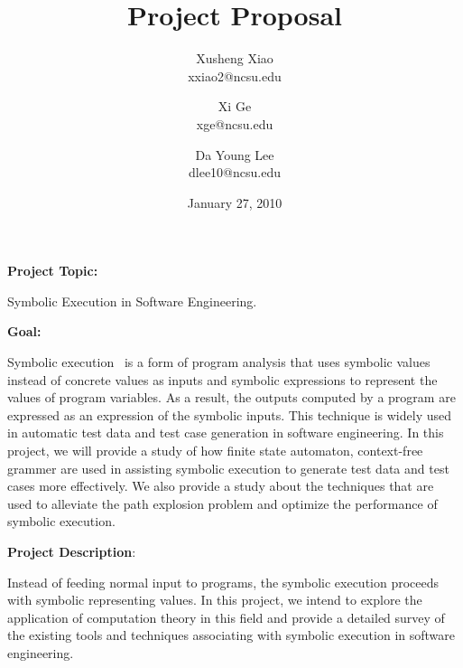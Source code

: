 \documentclass[times, 10pt,onecolumn]{article}
\title{Project Proposal}
\author{
Xusheng Xiao\\
\small{xxiao2@ncsu.edu}\\
\and
Xi Ge\\
\small{xge@ncsu.edu}\\
\and
Da Young Lee\\
\small{dlee10@ncsu.edu}
}
\date{January 27, 2010}
\begin{document}
\maketitle

\begin{flushleft}
\textbf{Project Topic:}\end{flushleft} Symbolic Execution in Software Engineering.\\

\begin{flushleft}
\textbf{Goal:}\end{flushleft}
Symbolic execution~\cite{symbolic} is a form of program analysis that uses symbolic values instead of concrete values as inputs and symbolic expressions to represent the values of program variables. As a result, the outputs computed by a program are expressed as an expression of the symbolic inputs. This technique is widely used in automatic test data and test case generation in software engineering. In this project, we will provide a study of how finite state automaton, context-free grammer are used in assisting symbolic execution to generate test data and test cases more effectively. We also provide a study about the techniques that are used to alleviate the path explosion problem and optimize the performance of symbolic execution. 
\\

\begin{flushleft}
\textbf{Project Description}:\end{flushleft}
Instead of feeding normal input to programs, the symbolic execution proceeds with symbolic representing values\cite{symbolic}. In this project, we intend to explore the application of computation theory in this field and provide a detailed survey of the existing tools and techniques associating with symbolic execution in software engineering. 
\end{document}
